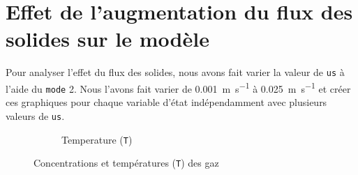 \documentclass[11pt]{report}
\begin{document}
        \section{Effet de l'augmentation du flux des solides sur le modèle}
            Pour analyser l'effet du flux des solides,
            nous avons fait varier la valeur de \verb|us| à l'aide du \verb|mode| 2.
            Nous l'avons fait varier de \SI{0.001}{\meter\per\second} à \SI{0.025}{\meter\per\second}
             et créer ces graphiques pour chaque variable d'état indépendamment avec plusieurs valeurs de \verb|us|.
            \begin{figure}[ht]
                \centering
                \begin{subfigure}[t]{0.325\textwidth}
                    \centering
                    
                    \caption{}
                    \label{graph:con:2:CH4}
                \end{subfigure}
                \hfill
                \begin{subfigure}[t]{0.325\textwidth}
                    \centering
                    
                    \caption{}
                    \label{graph:con:2:H2}
                \end{subfigure}
                \hfill
                \begin{subfigure}[t]{0.325\textwidth}
                    \centering
                    
                    \caption{}
                    \label{graph:con:2:CO}
                \end{subfigure}
                \hfill
                \begin{subfigure}[t]{0.325\textwidth}
                    \centering
                    
                    \caption{}
                    \label{graph:con:2:CO2}
                \end{subfigure}
                \begin{subfigure}[t]{0.325\textwidth}
                    \centering
                    
                    \caption{Temperature (\texttt{T})}
                    \label{graph:con:2:T}
                \end{subfigure}
                \caption{Concentrations et températures (\texttt{T}) des gaz}
                \label{graph:con:2}
            \end{figure}
\end{document}
